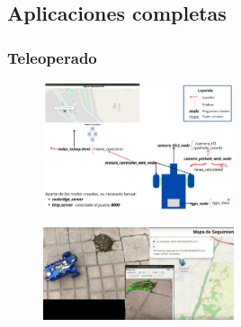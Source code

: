 \documentclass{beamer}
\begin{document}
\subsection{Aplicaciones completas}
\begin{frame}
\frametitle{Teleoperado}
  
  	\begin{figure}
	\centering
	\includegraphics[width=0.5\textwidth]{figs/esquema_nodos_teleoperado_ampliado.png} %
	\end{figure}

\vspace{0.15cm} %

\begin{figure}
	\centering
	\includegraphics[width=0.5\textwidth]{figs/teleop_final.png} %
\end{figure}
\end{frame}
\end{document}
